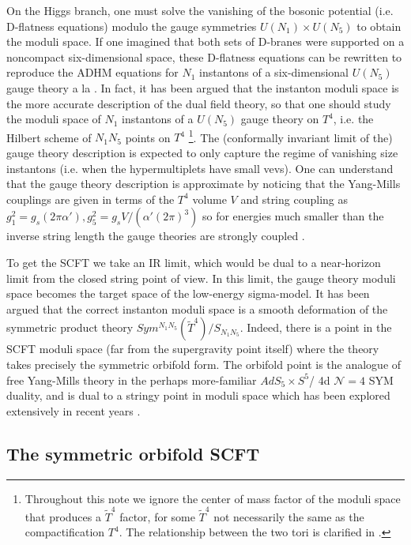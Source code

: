 \documentclass[11pt]{amsart}
\newcommand{\mc}{\mathcal}
\theoremstyle{thm}
\numberwithin{equation}{subsection}
\theoremstyle{def}
\theoremstyle{rem}
\begin{document}
On the Higgs branch, one must solve the vanishing of the bosonic potential (i.e. D-flatness equations) modulo the gauge symmetries $U(N_1)\times U(N_5)$ to obtain the moduli space. 
If one imagined that both sets of D-branes were supported on a noncompact six-dimensional space, these D-flatness equations can be rewritten to reproduce the ADHM equations for $N_1$ instantons of a six-dimensional $U(N_5)$ gauge theory a la \cite{WittenADHM}. 
In fact, it has been argued that the instanton moduli space is the more accurate description of the dual field theory, so that one should study the moduli space of $N_1$ instantons of a $U(N_5)$ gauge theory on $T^4$, i.e. the Hilbert scheme of $N_1 N_5$ points on $T^4$ \footnote{Throughout this note we ignore the center of mass factor of the moduli space that produces a $\tilde{T}^4$ factor, for some $\tilde{T}^4$ not necessarily the same as the compactification $T^4$. The relationship between the two tori is clarified in \cite{GiveonKutasovSeiberg}.}. The (conformally invariant limit of the) gauge theory description is expected to only capture the regime of vanishing size instantons (i.e. when the hypermultiplets have small vevs). One can understand that the gauge theory description is approximate by noticing that the Yang-Mills couplings are given in terms of the $T^4$ volume $V$ and string coupling as $g_1^2 = g_s (2 \pi \alpha'), g_5^2 = g_s V/(\alpha' (2\pi)^3)$ so for energies much smaller than the inverse string length the gauge theories are strongly coupled \cite{Davidetal}. 


To get the SCFT we take an IR limit, which would be dual to a near-horizon limit from the closed string point of view. In this limit, the gauge theory moduli space becomes the target space of the low-energy sigma-model. It has been argued that the correct instanton moduli space is a smooth deformation of the symmetric product theory $Sym^{N_1 N_5}(\tilde{T}^4)/S_{N_1 N_5}$. Indeed, there is a point in the SCFT moduli space (far from the supergravity point itself) where the theory takes precisely the symmetric orbifold form. The orbifold point is the analogue of free Yang-Mills theory in the perhaps more-familiar $AdS_5\times S^5$/ 4d $\mc N =4$ SYM duality, and is dual to a stringy point in moduli space which has been explored extensively in recent years \cite{Eberhardtetal}.
 

\subsection{The symmetric orbifold SCFT}
\end{document}
